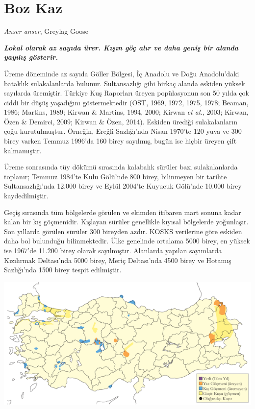 \documentclass[
  a4paper,
  DIV=11,
  numbers=noendperiod]{scrreprt}
\begin{document}
\section{Boz Kaz}\label{boz-kaz}

\emph{Anser anser}, Greylag Goose

\textbf{\emph{Lokal olarak az sayıda ürer. Kışın göç alır ve daha geniş
bir alanda yayılış gösterir.}}

Üreme döneminde az sayıda Göller Bölgesi, İç Anadolu ve Doğu
Anadolu'daki bataklık sulakalanlarda bulunur. Sultansazlığı gibi birkaç
alanda eskiden yüksek sayılarda üremiştir. Türkiye Kuş Raporları üreyen
popülasyonun son 50 yılda çok ciddi bir düşüş yaşadığını göstermektedir
(OST, 1969, 1972, 1975, 1978; Beaman, 1986; Martins, 1989; Kirwan \&
Martins, 1994, 2000; Kirwan \emph{et al.}, 2003; Kirwan, Özen \&
Demirci, 2009; Kirwan \& Özen, 2014). Eskiden ürediği sulakalanların
çoğu kurutulmuştur. Örneğin, Ereğli Sazlığı'nda Nisan 1970'te 120 yuva
ve 300 birey varken Temmuz 1996'da 160 birey sayılmış, bugün ise hiçbir
üreyen çift kalmamıştır.

Üreme sonrasında tüy dökümü sırasında kalabalık sürüler bazı
sulakalanlarda toplanır; Temmuz 1984'te Kulu Gölü'nde 800 birey,
bilinmeyen bir tarihte Sultansazlığı'nda 12.000 birey ve Eylül 2004'te
Kuyucuk Gölü'nde 10.000 birey kaydedilmiştir.

Geçiş sırasında tüm bölgelerde görülen ve ekimden itibaren mart sonuna
kadar kalan bir kış göçmenidir. Kışlayan sürüler genellikle kıyısal
bölgelerde yoğunlaşır. Son yıllarda görülen sürüler 300 bireyden azdır.
KOSKS verilerine göre eskiden daha bol bulunduğu bilinmektedir. Ülke
genelinde ortalama 5000 birey, en yüksek ise 1967'de 11.200 birey olarak
sayılmıştır. Alanlarda yapılan sayımlarda Kızılırmak Deltası'nda 5000
birey, Meriç Deltası'nda 4500 birey ve Hotamış Sazlığı'nda 1500 birey
tespit edilmiştir.

\includegraphics{images/harita_Page_002.png}
\end{document}
